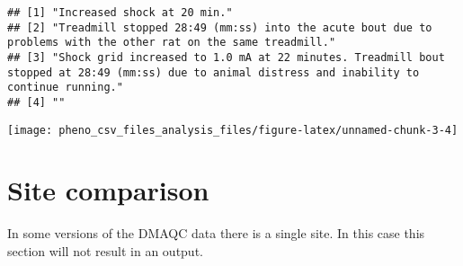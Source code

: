 \documentclass[]{article}
\newenvironment{Shaded}{\begin{snugshade}}{\end{snugshade}}
\newcommand{\KeywordTok}[1]{\textcolor[rgb]{0.13,0.29,0.53}{\textbf{#1}}}
\newcommand{\DataTypeTok}[1]{\textcolor[rgb]{0.13,0.29,0.53}{#1}}
\newcommand{\DecValTok}[1]{\textcolor[rgb]{0.00,0.00,0.81}{#1}}
\newcommand{\StringTok}[1]{\textcolor[rgb]{0.31,0.60,0.02}{#1}}
\newcommand{\CommentTok}[1]{\textcolor[rgb]{0.56,0.35,0.01}{\textit{#1}}}
\newcommand{\OperatorTok}[1]{\textcolor[rgb]{0.81,0.36,0.00}{\textbf{#1}}}
\newcommand{\NormalTok}[1]{#1}
\begin{document}
\begin{verbatim}
## [1] "Increased shock at 20 min."                                                                                                                     
## [2] "Treadmill stopped 28:49 (mm:ss) into the acute bout due to problems with the other rat on the same treadmill."                                  
## [3] "Shock grid increased to 1.0 mA at 22 minutes. Treadmill bout stopped at 28:49 (mm:ss) due to animal distress and inability to continue running."
## [4] ""
\end{verbatim}

\begin{Shaded}
\end{Shaded}

\texttt{[image: pheno\_csv\_files\_analysis\_files/figure-latex/unnamed-chunk-3-4]}

\section{Site comparison}\label{site-comparison}

In some versions of the DMAQC data there is a single site. In this case
this section will not result in an output.
\end{document}
